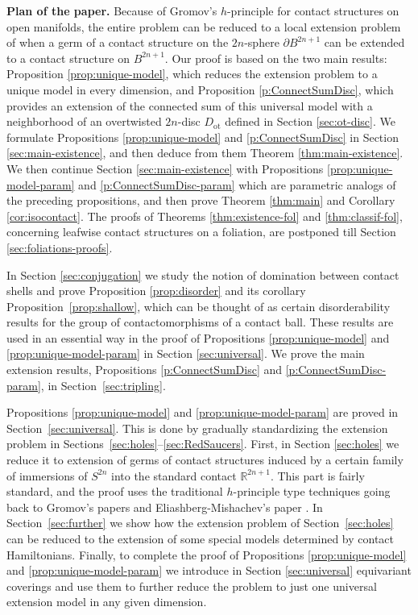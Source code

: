 \documentclass[12pt]{paper}
\theoremstyle{plain}
\theoremstyle{definition}
\newcommand{\p}{\partial}
\newcommand{\R}{{\mathbb{R}}}
\newcommand{\ot}{\mathrm{ot}}
\numberwithin{figure}{section}
\begin{document}
{\bf Plan of the paper.}  
 Because of Gromov's $h$-principle for contact structures on open manifolds, the entire problem can be reduced to a local extension problem of when a germ of a contact structure on the $2n$-sphere $\p B^{2n+1}$
can be extended to a contact structure on $B^{2n+1}$.
Our proof is based on the two main results: Proposition  \ref{prop:unique-model}, which reduces the extension problem to a unique model in every dimension, and Proposition \ref{p:ConnectSumDisc}, which provides an extension of the connected sum of this universal  model with a neighborhood of an overtwisted  $2n$-disc  $D_\ot$ defined in Section \ref{sec:ot-disc}. 
We formulate Propositions  \ref{prop:unique-model} and \ref{p:ConnectSumDisc}   in Section \ref{sec:main-existence}, and then deduce from them Theorem \ref{thm:main-existence}. We then continue   Section \ref{sec:main-existence} 
with Propositions \ref{prop:unique-model-param} and  \ref{p:ConnectSumDisc-param}   which are parametric analogs of the preceding propositions, and then prove Theorem \ref{thm:main} and Corollary \ref{cor:isocontact}. The proofs of Theorems \ref{thm:existence-fol} and
\ref{thm:classif-fol}, concerning leafwise contact structures on a foliation, are postponed till  Section \ref{sec:foliations-proofs}.

In Section \ref{sec:conjugation} we   study  the notion of domination between contact shells and prove Proposition \ref{prop:disorder} and its corollary  Proposition~\ref{prop:shallow}, which can be thought of as certain disorderability results for  the group of contactomorphisms of  a contact ball.   These results are used in an essential way   in the proof of Propositions \ref{prop:unique-model} and \ref{prop:unique-model-param} in Section \ref{sec:universal}.
We prove the main extension results,  Propositions \ref{p:ConnectSumDisc} and \ref{p:ConnectSumDisc-param},
 in Section~\ref{sec:tripling}.      
  
   Propositions \ref{prop:unique-model} and \ref{prop:unique-model-param} are proved in Section~\ref{sec:universal}. 
 This is done by gradually standardizing the extension problem in Sections~\ref{sec:holes}--\ref{sec:RedSaucers}. 
 First, in Section \ref{sec:holes} we reduce it to extension of   germs of contact structures induced by a certain family of immersions of $S^{2n}$ into the standard contact $\R^{2n+1}$. This part is fairly  standard, and  the proof uses the traditional  $h$-principle type techniques going back to Gromov's papers \cite{Gro69, Gro72}  and Eliashberg-Mishachev's  paper  \cite{EliMi97}.  
 In Section~\ref{sec:further} we show how the extension problem of Section~\ref{sec:holes} can be reduced to the extension of some special models determined by contact Hamiltonians.   Finally,  to complete the proof of 
 Propositions \ref{prop:unique-model} and \ref{prop:unique-model-param} we introduce in
 Section \ref{sec:universal}  equivariant coverings  and use them   to further reduce  the problem to just one   universal  extension model in any given dimension. 
\end{document}
